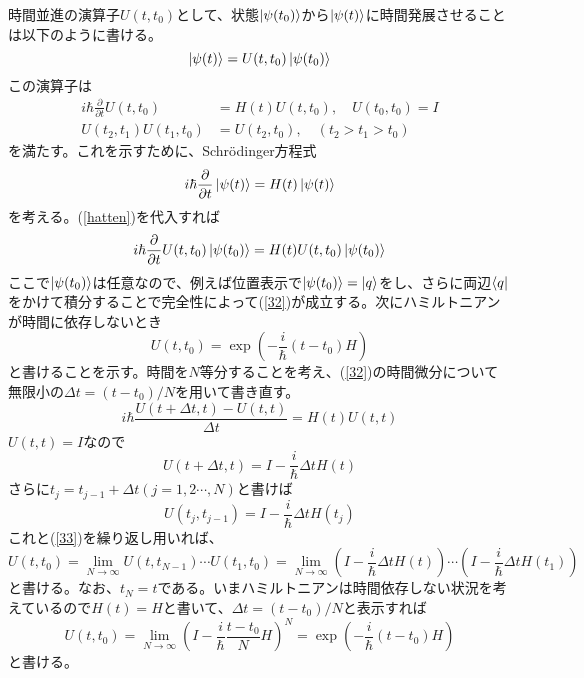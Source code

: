 \documentclass[10pt]{jsarticle}
\newcommand{\kakko}[1]{\left(#1 \right)} %
\newcommand{\henbi}[2]{{\frac{\partial#1}{\partial#2}}} %
\numberwithin{equation}{section}%
\begin{document}
時間並進の演算子$U(t,t_{0})$として、状態$\ket{\psi(t_{0})}$から$\ket{\psi(t)}$に時間発展させることは以下のように書ける。
\begin{equation}
\label{hatten}  \ket{\psi(t)}=U(t,t_0)\ket{\psi(t_{0})}
\end{equation}
この演算子は
\begin{align}
 \label{32} i\hbar \henbi{}{t}U(t,t_{0})&=H(t)U(t,t_{0}),\quad U(t_{0},t_{0})=I\\
  \label{33} U(t_{2},t_{1})U(t_{1},t_{0})&=U(t_{2},t_{0}),\quad(t_{2}>t_{1}>t_{0})
\end{align}
を満たす。これを示すために、Schrödinger方程式
\begin{equation}
  i\hbar \henbi{}{t}\ket{\psi(t)}=H(t)\ket{\psi(t)}
\end{equation}
を考える。(\ref{hatten})を代入すれば
\begin{equation}
  i\hbar \henbi{}{t}U(t,t_0)\ket{\psi(t_{0})}=H(t)U(t,t_0)\ket{\psi(t_{0})}
\end{equation}
ここで$\ket{\psi(t_0)}$は任意なので、例えば位置表示で$\ket{\psi(t_{0})}=\ket{q}$をし、さらに両辺$\bra{q}$をかけて積分することで完全性によって(\ref{32})が成立する。次にハミルトニアンが時間に依存しないとき
\begin{equation}
  U(t,t_{0})=\exp\kakko{-\frac{i}{\hbar} (t-t_0)H}
\end{equation}
と書けることを示す。時間を$N$等分することを考え、(\ref{32})の時間微分について無限小の$\Delta t=(t-t_{0})/N$を用いて書き直す。
\begin{equation}
  i\hbar \frac{U(t+\Delta t,t)-U(t,t)}{\Delta t}=H(t)U(t,t)
\end{equation}
$U(t,t)=I$なので
\begin{equation}
   U(t+\Delta t,t)=I-\frac{i}{\hbar}\Delta t H(t)
\end{equation}
さらに$t_{j}=t_{j-1}+\Delta t(j=1,2\cdots,N)$と書けば
\begin{equation}
  U(t_{j},t_{j-1})=I-\frac{i}{\hbar}\Delta t H(t_{j})
\end{equation}
これと(\ref{33})を繰り返し用いれば、
\begin{equation}
  U(t,t_{0})=\lim_{N\to \infty} U(t,t_{N-1})\cdots U(t_{1},t_{0})=\lim_{N\to \infty}\kakko{ I-\frac{i}{\hbar}\Delta t H(t) }\cdots \kakko{I-\frac{i}{\hbar}\Delta t H(t_{1})}
\end{equation}
と書ける。なお、$t_{N}=t$である。いまハミルトニアンは時間依存しない状況を考えているので$H(t)=H$と書いて、$\Delta t=(t-t_{0})/N$と表示すれば
\begin{equation}
  U(t,t_{0})=\lim_{N\to \infty}\kakko{I-\frac{i}{\hbar}\frac{t-t_0}{N}H }^{N}=\exp\kakko{-\frac{i}{\hbar}(t-t_{0})H}
\end{equation}
と書ける。
\end{document}
